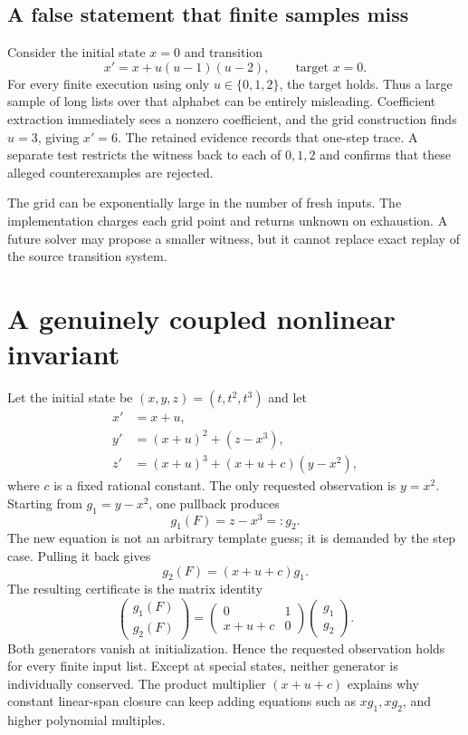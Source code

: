 \documentclass[11pt,letterpaper]{article}
\theoremstyle{definition}
\begin{document}
\subsection{A false statement that finite samples miss}
Consider the initial state $x=0$ and transition
\[
 x'=x+u(u-1)(u-2),\qquad\text{target }x=0.
\]
For every finite execution using only $u\in\{0,1,2\}$, the target holds. Thus a
large sample of long lists over that alphabet can be entirely misleading.
Coefficient extraction immediately sees a nonzero coefficient, and the grid
construction finds $u=3$, giving $x'=6$. The retained evidence records that
one-step trace. A separate test restricts the witness back to each of $0,1,2$
and confirms that these alleged counterexamples are rejected.

The grid can be exponentially large in the number of fresh inputs. The
implementation charges each grid point and returns unknown on exhaustion. A
future solver may propose a smaller witness, but it cannot replace exact replay
of the source transition system.

\section{A genuinely coupled nonlinear invariant}
\label{sec:coupled}

Let the initial state be $(x,y,z)=(t,t^2,t^3)$ and let
\begin{align*}
 x'&=x+u,\\
 y'&=(x+u)^2+(z-x^3),\\
 z'&=(x+u)^3+(x+u+c)(y-x^2),
\end{align*}
where $c$ is a fixed rational constant. The only requested observation is
$y=x^2$. Starting from $g_1=y-x^2$, one pullback produces
\[
 g_1(F)=z-x^3=:g_2.
\]
The new equation is not an arbitrary template guess; it is demanded by the
step case. Pulling it back gives
\[
 g_2(F)=(x+u+c)g_1.
\]
The resulting certificate is the matrix identity
\[
\begin{pmatrix}g_1(F)\\g_2(F)\end{pmatrix}
 =
\begin{pmatrix}0&1\\x+u+c&0\end{pmatrix}
\begin{pmatrix}g_1\\g_2\end{pmatrix}.
\]
Both generators vanish at initialization. Hence the requested observation holds
for every finite input list. Except at special states, neither generator is
individually conserved. The product multiplier $(x+u+c)$ explains why constant
linear-span closure can keep adding equations such as $xg_1,xg_2$, and higher
polynomial multiples.
\end{document}
